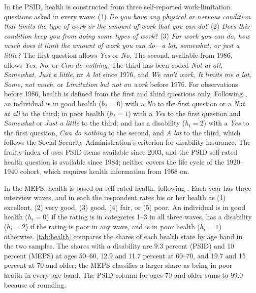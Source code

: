 In the PSID, health is constructed from three self-reported work-limitation questions asked in every wave: (1) \textsl{Do you have any physical or nervous condition that limits the type of work or the amount of work that you can do?} (2) \textsl{Does this condition keep you from doing some types of work?} (3) \textsl{For work you can do, how much does it limit the amount of work you can do---a lot, somewhat, or just a little?} %
The first question allows \textsl{Yes} or \textsl{No}. The second, available from 1986, allows \textsl{Yes}, \textsl{No}, or \textsl{Can do nothing}. The third has been coded \textsl{Not at all}, \textsl{Somewhat}, \textsl{Just a little}, or \textsl{A lot} since 1976, and \textsl{We can't work}, \textsl{It limits me a lot}, \textsl{Some, not much}, or \textsl{Limitation but not on work} before 1976. %
For observations before 1986, health is defined from the first and third questions only. %
Following \citet{Low2015}, an individual is in good health ($h_t=0$) with a \textsl{No} to the first question or a \textsl{Not at all} to the third; in poor health ($h_t=1$) with a \textsl{Yes} to the first question and \textsl{Somewhat} or \textsl{Just a little} to the third; and has a disability ($h_t=2$) with a \textsl{Yes} to the first question, \textsl{Can do nothing} to the second, and \textsl{A lot} to the third, which follows the Social Security Administration's criterion for disability insurance. %
The frailty index of \citet{hosseini2022evolution} uses PSID items available since 2003, and the PSID self-rated health question is available since 1984; neither covers the life cycle of the 1920--1940 cohort, which requires health information from 1968 on. %

In the MEPS, health is based on self-rated health, following \citet{Pashchenko2019}. Each year has three interview waves, and in each the respondent rates his or her health as (1) excellent, (2) very good, (3) good, (4) fair, or (5) poor. %
An individual is in good health ($h_t=0$) if the rating is in categories 1--3 in all three waves, has a disability ($h_t=2$) if the rating is poor in any wave, and is in poor health ($h_t=1$) otherwise. %
\autoref{tab:health} compares the shares of each health state by age band in the two samples. The shares with a disability are 9.3 percent (PSID) and 10 percent (MEPS) at ages 50--60, 12.9 and 11.7 percent at 60--70, and 19.7 and 15 percent at 70 and older; the MEPS classifies a larger share as being in poor health in every age band. %
The PSID column for ages 70 and older sums to 99.0 because of rounding. %

